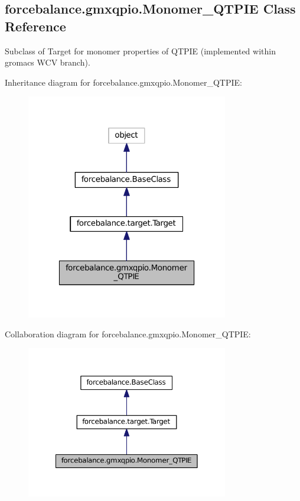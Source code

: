 \hypertarget{classforcebalance_1_1gmxqpio_1_1Monomer__QTPIE}{\subsection{forcebalance.\-gmxqpio.\-Monomer\-\_\-\-Q\-T\-P\-I\-E Class Reference}
\label{classforcebalance_1_1gmxqpio_1_1Monomer__QTPIE}
}


Subclass of Target for monomer properties of Q\-T\-P\-I\-E (implemented within gromacs W\-C\-V branch).  




Inheritance diagram for forcebalance.\-gmxqpio.\-Monomer\-\_\-\-Q\-T\-P\-I\-E\-:\nopagebreak
\begin{figure}[H]
\begin{center}
\leavevmode
\includegraphics[width=250pt]{classforcebalance_1_1gmxqpio_1_1Monomer__QTPIE__inherit__graph}
\end{center}
\end{figure}


Collaboration diagram for forcebalance.\-gmxqpio.\-Monomer\-\_\-\-Q\-T\-P\-I\-E\-:\nopagebreak
\begin{figure}[H]
\begin{center}
\leavevmode
\includegraphics[width=250pt]{classforcebalance_1_1gmxqpio_1_1Monomer__QTPIE__coll__graph}
\end{center}
\end{figure}

